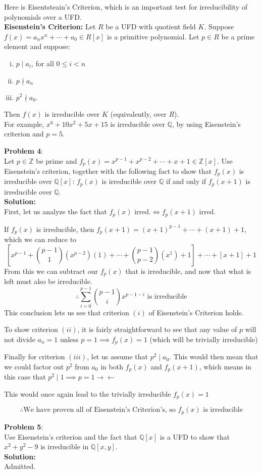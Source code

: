 \documentclass[11pt]{article}
\newcommand{\prob}[3]{\begin{flushleft}
        \textbf{Problem #1}: \\
        #2 
		\textbf{Solution:} 
		#3

\end{flushleft}}
\begin{document}
Here is Eisentsteain's Criterion, which is an important test for irreducibility of polynomials over a UFD. \\
\textbf{Eisenstein's Criterion:} Let $R$ be a UFD with quotient field $K$.
Suppose $f(x) = a_nx^n + \cdots + a_0 \in R[x]$ is a primitive polynomial.
Let $p \in R$ be a prime element and suppose:
\begin{enumerate}[(i)]
  \item $p \mid a_i$, for all $0 \leq i < n$
  \item $p \nmid a_n$
  \item $p^2 \nmid a_0$.
\end{enumerate}
Then $f(x)$ is irreducible over $K$ (equivalently, over $R$).\\
For example, $x^6 + 10x^2 + 5x + 15$ is irreducible over $\mathbb{Q}$, by using Eisenstein's criterion and $p = 5$.

\prob{4}{
Let $p \in \mathbb{Z}$ be prime and $f_p(x) = x^{p-1} + x^{p-2} + \cdots + x + 1 \in \mathbb{Z}[x]$. Use Eisenstein's criterion, together with the following fact to show that $f_p(x)$ is irreducible over $\mathbb{Q}[x]$: $f_p(x)$ is irreducible over $\mathbb{Q}$ if and only if $f_p(x + 1)$ is irreducible over $\mathbb{Q}$. \\
}{ \\
First, let us analyze the fact that $f_p(x) \text{ irred.} \iff f_p(x + 1) \text{ irred.}$

If $f_p(x)$ is irreducible, then $f_p(x + 1) = (x + 1)^{p-1} + \cdots + (x + 1) + 1$,
which we can reduce to
$$[x^{p - 1} + \binom{p-1}{1}(x^{p-2})(1) + \cdots + \binom{p-1}{p-2}(x^{1}) + 1] + \cdots + [x + 1] + 1$$
From this we can subtract our $f_p(x)$ that is irreducible, and now that what is left must also be irreducible.
$$\therefore \sum_{i=0}^{p - 1}\binom{p-1}{i}x^{p-1-i} \text{ is irreducible}$$
This conclusion lets us see that criterion $(i)$ of Eisenstein's Criterion holds.

To show criterion $(ii)$, it is fairly straightforward to see that
any value of $p$ will not divide $a_n = 1$ unless $p = 1 \implies f_p(x) = 1$ (which will be trivially irreducible)

Finally for criterion $(iii)$, let us assume that $p^2 \mid a_0$.
This would then mean that we could factor out $p^2$ from $a_0$ in both $f_p(x)$ and $f_p(x + 1)$, which means in this case that $p^2 \mid 1 \implies p = 1 \rightarrow\leftarrow$

This would once again lead to the trivially irreducible $f_p(x) = 1$

$$\therefore \text{We have proven all of Eisenstein's Criterion's, so $f_p(x)$ is irreducible}$$
}

\prob{5}{
  Use Eisenstein's criterion and the fact that $\mathbb{Q}[x]$ is a UFD to show that $x^2 + y^2 - 9$ is irreducible in $\mathbb{Q}[x,y]$. \\
}{ \\
  Admitted.
}
\end{document}
